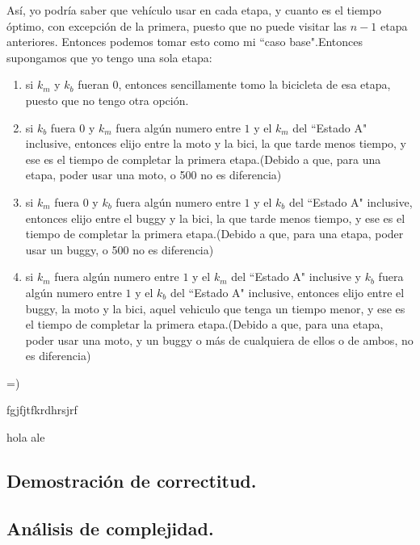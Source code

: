 Así, yo podría saber que vehículo usar en cada etapa, y cuanto es el tiempo óptimo, con excepción de la primera, puesto que no puede visitar las $n-1$ etapa anteriores. Entonces podemos tomar esto como mi ``caso base".Entonces supongamos que yo tengo una sola etapa:
  \begin{enumerate}
  \item si $k_{m}$ y $k_{b}$ fueran $0$, entonces sencillamente tomo la bicicleta de esa etapa, puesto que no tengo otra opción.
  \item si $k_{b}$ fuera $0$ y $k_{m}$ fuera algún numero entre $1$ y el $k_{m}$ del ``Estado A" inclusive, entonces elijo entre la moto y la bici, la que tarde menos tiempo, y ese es el tiempo de completar la primera etapa.(Debido a que, para una etapa, poder usar una moto, o 500 no es diferencia)
  \item si $k_{m}$ fuera $0$ y $k_{b}$ fuera algún numero entre $1$ y el $k_{b}$ del ``Estado A" inclusive, entonces elijo entre el buggy y la bici, la que tarde menos tiempo, y ese es el tiempo de completar la primera etapa.(Debido a que, para una etapa, poder usar un buggy, o 500 no es diferencia)
  \item si $k_{m}$ fuera algún numero entre $1$ y el $k_{m}$ del ``Estado A" inclusive y $k_{b}$ fuera algún numero entre $1$ y el $k_{b}$ del ``Estado A" inclusive, entonces elijo entre el buggy, la moto y la bici, aquel vehiculo que tenga un tiempo menor, y ese es el tiempo de completar la primera etapa.(Debido a que, para una etapa, poder usar una moto, y un buggy o más de cualquiera de ellos o de ambos, no es diferencia)
  \end{enumerate}
  
   
  
  
  =)
  
   fgjfjtfkrdhrsjrf
   
   hola ale

\vspace*{0.6cm}

\subsection{Demostración de correctitud.}

\vspace*{0.3cm}



\vspace*{0.6cm}

\subsection{Análisis de complejidad.}

